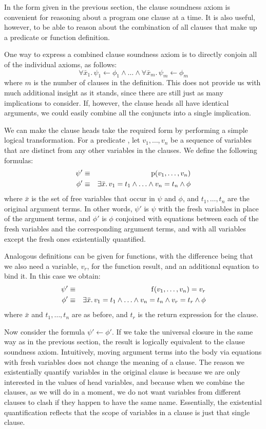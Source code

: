 In the form given in the previous section,
the clause soundness axiom is convenient
for reasoning about a program one clause at a time.
It is also useful, however,
to be able to reason about the combination of all clauses
that make up a predicate or function definition.

One way to express a combined clause soundness axiom
is to directly conjoin all of the individual axioms,
as follows:
\[
    \forall \bar{x}_1.\, \psi_1 \leftarrow \phi_1
    \land \ldots \land
    \forall \bar{x}_m.\, \psi_m \leftarrow \phi_m
\]
where $m$ is the number of clauses in the definition.
This does not provide us with much additional insight as it stands,
since there are still just as many implications to consider.
If, however,
the clause heads all have identical arguments,
we could easily combine all the conjuncts
into a single implication.

We can make the clause heads take the required form
by performing a simple logical transformation.
For a predicate ,
let $v_1, \ldots, v_n$ be a sequence of variables
that are distinct from any other variables in the clauses.
We define the following formulas:
\begin{eqnarray*}
\psi' & \equiv & \operatorname{p}(v_1, \ldots, v_n) \\
\phi' & \equiv &
    \exists \bar{x}.\, v_1 = t_1 \land \ldots \land v_n = t_n \land \phi
\end{eqnarray*}
where $\bar{x}$ is the set of free variables
that occur in $\psi$ and $\phi$,
and $t_1, \ldots, t_n$ are the original argument terms.
In other words,
$\psi'$ is $\psi$ with the fresh variables
in place of the argument terms,
and $\phi'$ is $\phi$ conjoined with
equations between each of the fresh variables
and the corresponding argument terms,
and with all variables except the fresh ones existentially quantified.

Analogous definitions can be given for functions,
with the difference being that
we also need a variable, $v_r$, for the function result,
and an additional equation to bind it.
In this case we obtain:
\begin{eqnarray*}
\psi' & \equiv & \operatorname{f}(v_1, \ldots, v_n) = v_r \\
\phi' & \equiv &
    \exists \bar{x}.\, v_1 = t_1 \land \ldots \land v_n = t_n
    \land v_r = t_r \land \phi
\end{eqnarray*}
where $\bar{x}$ and $t_1, \ldots, t_n$ are as before,
and $t_r$ is the return expression for the clause.

Now consider the formula $\psi' \leftarrow \phi'$.
If we take the universal closure
in the same way as in the previous section,
the result is logically equivalent to
the clause soundness axiom.
Intuitively,
moving argument terms into the body
via equations with fresh variables
does not change the meaning of a clause.
The reason we existentially quantify
variables in the original clause
is because we are only interested in
the values of head variables,
and because when we combine the clauses,
as we will do in a moment,
we do not want variables from different clauses
to clash if they happen to have the same name.
Essentially, the existential quantification
reflects that the scope of variables in a clause
is just that single clause.

